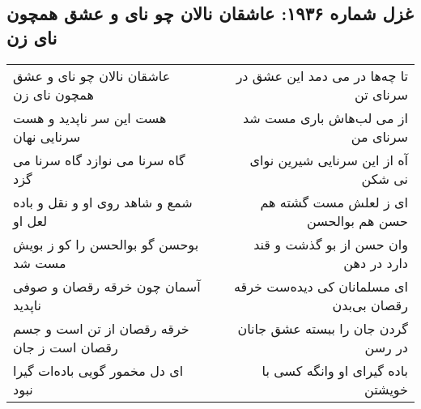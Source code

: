 \begin{center}
\section*{غزل شماره ۱۹۳۶: عاشقان نالان چو نای و عشق همچون نای زن}
\label{sec:1936}
\begin{longtable}{l p{0.5cm} r}
عاشقان نالان چو نای و عشق همچون نای زن
&&
تا چه‌ها در می دمد این عشق در سرنای تن
\\
هست این سر ناپدید و هست سرنایی نهان
&&
از می لب‌هاش باری مست شد سرنای من
\\
گاه سرنا می نوازد گاه سرنا می گزد
&&
آه از این سرنایی شیرین نوای نی شکن
\\
شمع و شاهد روی او و نقل و باده لعل او
&&
ای ز لعلش مست گشته هم حسن هم بوالحسن
\\
بوحسن گو بوالحسن را کو ز بویش مست شد
&&
وان حسن از بو گذشت و قند دارد در دهن
\\
آسمان چون خرقه رقصان و صوفی ناپدید
&&
ای مسلمانان کی دیده‌ست خرقه رقصان بی‌بدن
\\
خرقه رقصان از تن است و جسم رقصان است ز جان
&&
گردن جان را ببسته عشق جانان در رسن
\\
ای دل مخمور گویی باده‌ات گیرا نبود
&&
باده گیرای او وانگه کسی با خویشتن
\\
\end{longtable}
\end{center}
